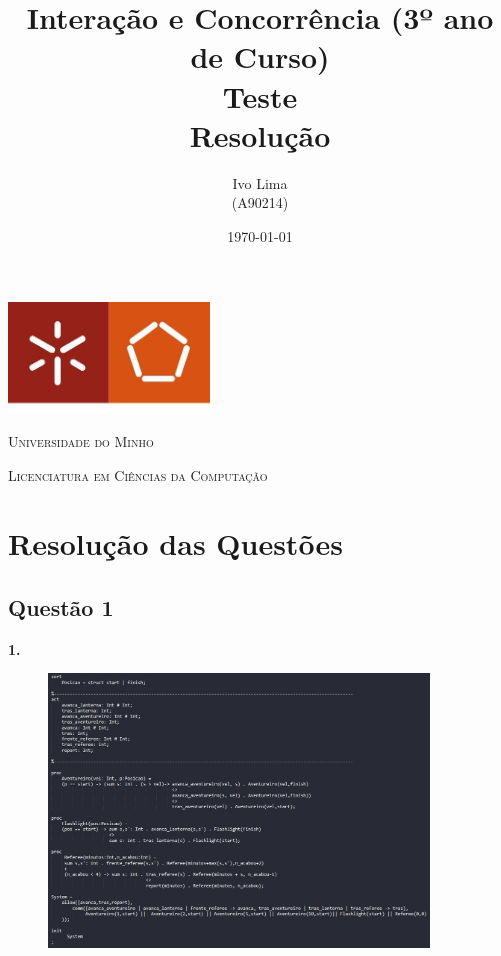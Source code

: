 \documentclass[11pt,a4paper]{report}
\title{Interação e Concorrência (3º ano de Curso)\\
       \textbf{Teste}\\ Resolução
       } %
\author{ Ivo Lima\\ (A90214)
       } %
\date{\today} %
\begin{document}
	\begin{minipage}{0.9\linewidth}
        \centering
		\includegraphics[width=0.4\textwidth]{um.jpeg}\par\vspace{1cm}
		{\scshape\LARGE Universidade do Minho} \par
		\vspace{0.6cm}
		{\scshape\Large Licenciatura em Ciências da Computação} \par
		\maketitle
	\end{minipage}


\tableofcontents %

\chapter{Resolução das Questões}

\section{Questão 1}

\textbf{1.} 

\begin{figure} [h]
        \centering
		\includegraphics[width=0.90\textwidth]{Ex1.jpeg}\par\vspace{1cm}
\end{figure}
\end{document}
